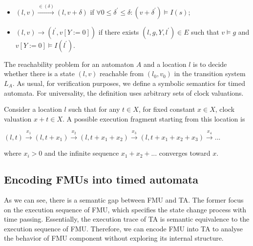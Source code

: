 \begin{itemize}
\item
$(l,v) \xrightarrow{\in(\delta)} (l,v+\delta)$ if $\forall0 \leqslant \delta^{\prime} \leqslant \delta : (v + \delta^{\prime}) \models I(s)$;
\item
$(l,v) \rightarrow (l^{\prime},v[Y := 0])$ if there exists $(l,g,Y,l^{\prime}) \in E$ such that $v \models g$ and $v[Y := 0] \models I(l^{\prime})$.
\end{itemize}
The reachability problem for an automaton $A$ and a location $l$ is to decide whether there is a state $(l,v)$ reachable from $(l_{0},v_{0})$ in the transition system $L_{A}$. As usual, for verification purposes, we define a symbolic semantics for timed automata. For universality, the definition uses arbitrary sets of clock valuations.

Consider a location $l$ such that for any $t \in X$, for fixed constant $x \in X$, clock valuation $x + t \in X$. A possible execution fragment starting from this location is

$(l,t) \xrightarrow{x_{1}} (l,t+x_{1}) \xrightarrow{x_{2}} (l,t+x_{1}+x_{2}) \xrightarrow{x_{3}} (l,t+x_{1}+x_{2}+x_{3}) \xrightarrow{x_{4}}...$

where $x_{i} > 0$ and the infinite sequence $x_{1} + x_{2} + . . .$ converges toward $x$. 
\subsection{Encoding FMUs into timed automata}
As we can see, there is a semantic gap between FMU and TA. The former focus on the execution sequence of FMU, which specifies the state change process with time passing. Essentially, the execution trace of TA is semantic equivalence to the execution sequence of FMU. Therefore, we can encode FMU into TA to analyse the behavior of FMU component without exploring its internal structure.


